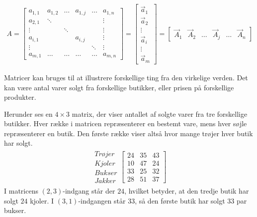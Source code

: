 \begin{align*}
A = \begin{bmatrix}
	a_{1,1} & a_{1,2} & \dots & a_{1,j} & \dots & a_{1,n} \\
	a_{2,1} & \ddots  &       &         &       & \vdots \\
	\vdots  &         & \ddots &        &       & \vdots \\
	a_{i,1} &         &       & a_{i,j} &       & \vdots \\
	\vdots  &         &       &         & \ddots& \vdots \\
	a_{m,1} & \dots   & \dots & \dots   & \dots & a_{m,n} 
\end{bmatrix}
=
\begin{bmatrix}
\vec{a}_1\\
\vec{a}_2\\
\vdots\\
\vec{a}_i\\
\vdots\\
\vec{a}_m
\end{bmatrix}
=
\begin{bmatrix}
\vec{A}_1	& \vec{A}_2	& \dots	& \vec{A}_j & \dots	& \vec{A}_n
\end{bmatrix}
\end{align*}



Matricer kan bruges til at illustrere forskellige ting fra den virkelige verden. Det kan være antal varer solgt fra forskellige butikker, eller prisen på forskellige produkter. 

\begin{eks}
Herunder ses en $4 \times 3$ matrix, der viser antallet af solgte varer fra tre forskellige butikker. Hver række i matricen repræsenterer en bestemt vare, mens hver søjle repræsenterer en butik. Den første række viser altså hvor mange trøjer hver butik har solgt.
\begin{align*}
\begin{matrix}
	Trøjer \\
	Kjoler \\
	Bukser \\
	Jakker
\end{matrix}
\begin{bmatrix}
	24 & 35 & 43 \\
	10 & 47 & 24 \\
	33 & 25 & 32 \\
	28 & 51 & 37
\end{bmatrix}
\end{align*}
I matricens $(2,3)$-indgang står der $24$, hvilket betyder, at den tredje butik har solgt $24$ kjoler. I $(3,1)$-indgangen står $33$, så den første butik har solgt $33$ par bukser. 
\end{eks}

